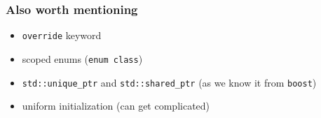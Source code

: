 \documentclass[english]{beamer}
\begin{document}
\begin{frame}
    \frametitle{Also worth mentioning}
    \begin{itemize}
        \item \texttt{override} keyword
        \item scoped enums (\texttt{enum class})
        \item \texttt{std::unique\_ptr} and \texttt{std::shared\_ptr} (as we know it from \texttt{boost})
        \item uniform initialization (can get complicated)
    \end{itemize}
\end{frame}
\end{document}
